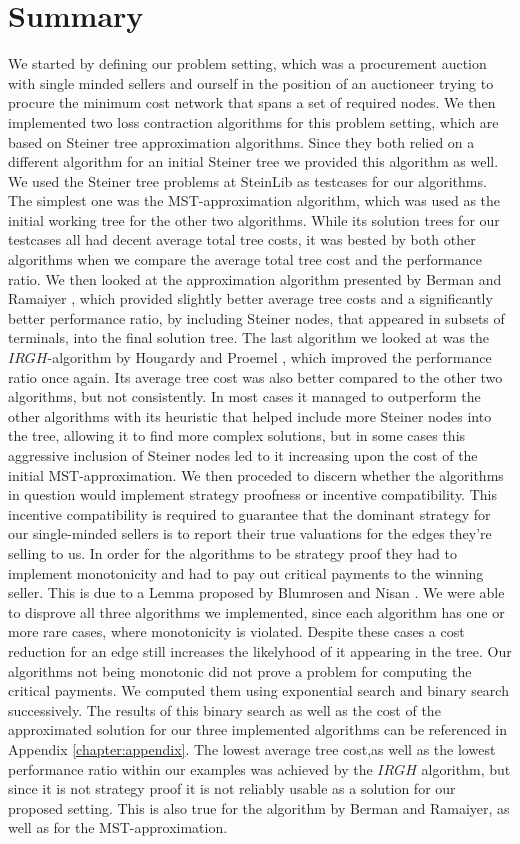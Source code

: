 
\chapter{Summary}\label{chapter:conclusion}

We started by defining our problem setting, which was a procurement auction with single minded sellers and ourself in the position of an auctioneer trying to procure the minimum cost network that spans a set of required nodes. We then implemented two loss contraction algorithms for this problem setting, which are based on Steiner tree approximation algorithms. Since they both relied on a different algorithm for an initial Steiner tree we provided this algorithm as well. We used the Steiner tree problems at SteinLib \cite{Dui93} as testcases for our algorithms. The simplest one was the MST-approximation algorithm, which was used as the initial working tree for the other two algorithms. While its solution trees for our testcases all had decent average total tree costs, it was bested by both other algorithms when we compare the average total tree cost and the performance ratio. We then looked at the approximation algorithm presented by Berman and Ramaiyer \cite{BeRa94}, which provided slightly better average tree costs and a significantly better performance ratio, by including Steiner nodes, that appeared in subsets of terminals, into the final solution tree. The last algorithm we looked at was the $IRGH$-algorithm by Hougardy and Proemel \cite{HoPr99}, which improved the performance ratio once again. Its average tree cost was also better compared to the other two algorithms, but not consistently. In most cases it managed to outperform the other algorithms with its heuristic that helped include more Steiner nodes into the tree, allowing it to find more complex solutions, but in some cases this aggressive inclusion of Steiner nodes led to it increasing upon the cost of the initial MST-approximation. We then proceded to discern whether the algorithms in question would implement strategy proofness or incentive compatibility. This incentive compatibility is required to guarantee that the dominant strategy for our single-minded sellers is to report their true valuations for the edges they're selling to us. In order for the algorithms to be strategy proof they had to implement monotonicity and had to pay out critical payments to the winning seller. This is due to a Lemma proposed by Blumrosen and Nisan \cite{BlNi07}. We were able to disprove all three algorithms we implemented, since each algorithm has one or more rare cases, where monotonicity is violated. Despite these cases a cost reduction for an edge still increases the likelyhood of it appearing in the tree. Our algorithms not being monotonic did not prove a problem for computing the critical payments. We computed them using exponential search and binary search successively. The results of this binary search as well as the cost of the approximated solution for our three implemented algorithms can be referenced in Appendix \ref{chapter:appendix}. The lowest average tree cost,as well as the lowest performance ratio within our examples was achieved by the $IRGH$ algorithm, but since it is not strategy proof it is not reliably usable as a solution for our proposed setting. This is also true for the algorithm by Berman and Ramaiyer, as well as for the MST-approximation.